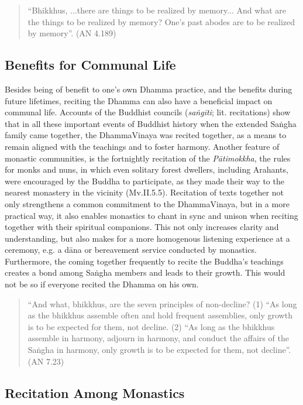 \begin{quote}
  ``Bhikkhus, ...there are things to be realized by memory... And what are the things to be realized by memory? One's past abodes are to be realized by memory''. (AN 4.189)
\end{quote}

\subsection*{Benefits for Communal Life}

Besides being of benefit to one's own Dhamma practice, and the benefits during future lifetimes, reciting the Dhamma can also have a beneficial impact on communal life. Accounts of the Buddhist councils (\textit{saṅgīti}; lit. recitations) show that in all these important events of Buddhist history when the extended Saṅgha family came together, the DhammaVinaya was recited together, as a means to remain aligned with the teachings and to foster harmony. Another feature of monastic communities, is the fortnightly recitation of the \textit{Pātimokkha}, the rules for monks and nuns, in which even solitary forest dwellers, including Arahants, were encouraged by the Buddha to participate, as they made their way to the nearest monastery in the vicinity (Mv.II.5.5). Recitation of texts together not only strengthens a common commitment to the DhammaVinaya, but in a more practical way, it also enables monastics to chant in sync and unison when reciting together with their spiritual companions. This not only increases clarity and understanding, but also makes for a more homogenous listening experience at a ceremony, e.g. a dāna or bereavement service conducted by monastics. Furthermore, the coming together frequently to recite the Buddha's teachings creates a bond among Saṅgha members and leads to their growth. This would not be so if everyone recited the Dhamma on his own.

\begin{quote}
  ``And what, bhikkhus, are the seven principles of non-decline? (1) ``As long as the bhikkhus assemble often and hold frequent assemblies, only growth is to be expected for them, not decline. (2) ``As long as the bhikkhus assemble in harmony, adjourn in harmony, and conduct the affairs of the Saṅgha in harmony, only growth is to be expected for them, not decline''. (AN 7.23)
\end{quote}

\subsection*{Recitation Among Monastics}

